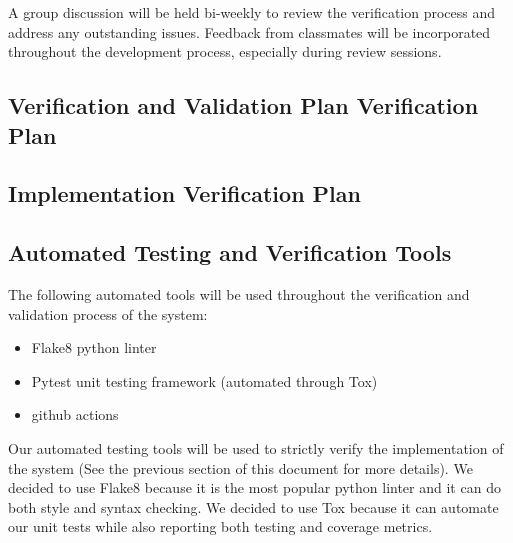 \documentclass[12pt, titlepage]{article}
\begin{document}
A group discussion will be held bi-weekly to review the verification process and address any outstanding issues. Feedback from classmates will be incorporated throughout the development process, especially during review sessions.

\subsection{Verification and Validation Plan Verification Plan}




\subsection{Implementation Verification Plan}




\subsection{Automated Testing and Verification Tools}
The following automated tools will be used throughout the verification and validation
process of the system:
\begin{itemize}
  \item Flake8 python linter
  \item Pytest unit testing framework (automated through Tox)
  \item github actions
\end{itemize}

\noindent
Our automated testing tools will be used to strictly verify the implementation of the system
(See the previous section of this document for more details). We decided to use Flake8
because it is the most popular python linter and it can do both style and syntax checking.
We decided to use Tox because it can automate our unit tests while also reporting both testing
and coverage metrics.\\
\end{document}
